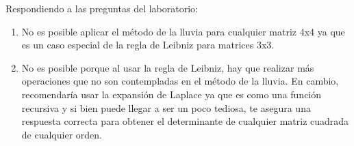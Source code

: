 \documentclass[12pt, letterpaper]{article}
\begin{document}
Respondiendo a las preguntas del laboratorio:
\begin{enumerate}
    \item No es posible aplicar el método de la lluvia para cualquier matriz 4x4 ya que es un caso especial de la regla de Leibniz para matrices 3x3.
    \item No es posible porque al usar la regla de Leibniz, hay que realizar más operaciones que no son contempladas en el método de la lluvia. En cambio, recomendaría usar la expansión de Laplace ya que es como una función recursiva y si bien puede llegar a ser un poco tediosa, te asegura una respuesta correcta para obtener el determinante de cualquier matriz cuadrada de cualquier orden.
\end{enumerate}
\end{document}
